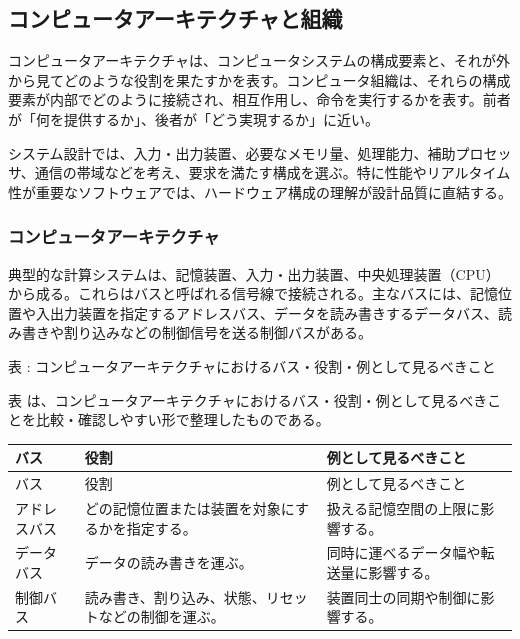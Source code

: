 \subsection{コンピュータアーキテクチャと組織}

コンピュータアーキテクチャは、コンピュータシステムの構成要素と、それが外から見てどのような役割を果たすかを表す。コンピュータ組織は、それらの構成要素が内部でどのように接続され、相互作用し、命令を実行するかを表す。前者が「何を提供するか」、後者が「どう実現するか」に近い。

システム設計では、入力・出力装置、必要なメモリ量、処理能力、補助プロセッサ、通信の帯域などを考え、要求を満たす構成を選ぶ。特に性能やリアルタイム性が重要なソフトウェアでは、ハードウェア構成の理解が設計品質に直結する。

\subsubsection{コンピュータアーキテクチャ}

典型的な計算システムは、記憶装置、入力・出力装置、中央処理装置（CPU）から成る。これらはバスと呼ばれる信号線で接続される。主なバスには、記憶位置や入出力装置を指定するアドレスバス、データを読み書きするデータバス、読み書きや割り込みなどの制御信号を送る制御バスがある。

\par\smallskip\noindent{}\label{tab:ch16-03}表 \thetable: コンピュータアーキテクチャにおけるバス・役割・例として見るべきこと\par\smallskip
表 \thetable は、コンピュータアーキテクチャにおけるバス・役割・例として見るべきことを比較・確認しやすい形で整理したものである。\par\smallskip
\begin{longtable}{>{\raggedright\arraybackslash}p{}>{\raggedright\arraybackslash}p{}>{\raggedright\arraybackslash}p{}}
\toprule
バス & 役割 & 例として見るべきこと \\
\midrule
\endfirsthead
\toprule
バス & 役割 & 例として見るべきこと \\
\midrule
\endhead
アドレスバス & どの記憶位置または装置を対象にするかを指定する。 & 扱える記憶空間の上限に影響する。 \\
データバス & データの読み書きを運ぶ。 & 同時に運べるデータ幅や転送量に影響する。 \\
制御バス & 読み書き、割り込み、状態、リセットなどの制御を運ぶ。 & 装置同士の同期や制御に影響する。 \\
\bottomrule
\end{longtable}

